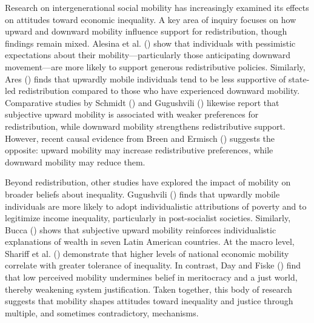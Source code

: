 \documentclass[
  12pt,
]{article}
\begin{document}
Research on intergenerational social mobility has increasingly examined
its effects on attitudes toward economic inequality. A key area of
inquiry focuses on how upward and downward mobility influence support
for redistribution, though findings remain mixed. Alesina et al.
() show that
individuals with pessimistic expectations about their
mobility---particularly those anticipating downward movement---are more
likely to support generous redistributive policies. Similarly, Ares
() finds that upwardly mobile
individuals tend to be less supportive of state-led redistribution
compared to those who have experienced downward mobility. Comparative
studies by Schmidt () and
Gugushvili ()
likewise report that subjective upward mobility is associated with
weaker preferences for redistribution, while downward mobility
strengthens redistributive support. However, recent causal evidence from
Breen and Ermisch () suggests the
opposite: upward mobility may increase redistributive preferences, while
downward mobility may reduce them.

Beyond redistribution, other studies have explored the impact of
mobility on broader beliefs about inequality. Gugushvili
() finds that
upwardly mobile individuals are more likely to adopt individualistic
attributions of poverty and to legitimize income inequality,
particularly in post-socialist societies. Similarly, Bucca
() shows that subjective upward
mobility reinforces individualistic explanations of wealth in seven
Latin American countries. At the macro level, Shariff et al.
() demonstrate that higher
levels of national economic mobility correlate with greater tolerance of
inequality. In contrast, Day and Fiske
() find that low perceived mobility
undermines belief in meritocracy and a just world, thereby weakening
system justification. Taken together, this body of research suggests
that mobility shapes attitudes toward inequality and justice through
multiple, and sometimes contradictory, mechanisms.
\end{document}
